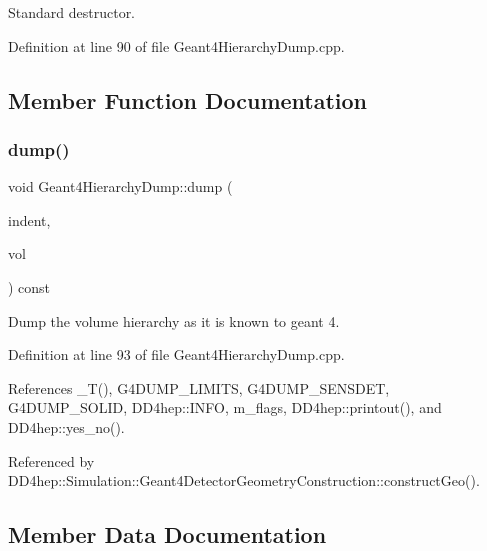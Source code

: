 Standard destructor. 



Definition at line 90 of file Geant4\+Hierarchy\+Dump.\+cpp.



\subsection{Member Function Documentation}
\hypertarget{class_d_d4hep_1_1_simulation_1_1_geant4_hierarchy_dump_a47fcb3062abf62695a7cff1bb61fa1e1}{}\label{class_d_d4hep_1_1_simulation_1_1_geant4_hierarchy_dump_a47fcb3062abf62695a7cff1bb61fa1e1} 
\subsubsection{\texorpdfstring{dump()}{dump()}}
{\footnotesize\ttfamily void Geant4\+Hierarchy\+Dump\+::dump (\begin{DoxyParamCaption}\item[{const std\+::string \&}]{indent,  }\item[{const G4\+V\+Physical\+Volume $\ast$}]{vol }\end{DoxyParamCaption}) const\hspace{0.3cm}{\ttfamily [virtual]}}



Dump the volume hierarchy as it is known to geant 4. 



Definition at line 93 of file Geant4\+Hierarchy\+Dump.\+cpp.



References \+\_\+\+T(), G4\+D\+U\+M\+P\+\_\+\+L\+I\+M\+I\+TS, G4\+D\+U\+M\+P\+\_\+\+S\+E\+N\+S\+D\+ET, G4\+D\+U\+M\+P\+\_\+\+S\+O\+L\+ID, D\+D4hep\+::\+I\+N\+FO, m\+\_\+flags, D\+D4hep\+::printout(), and D\+D4hep\+::yes\+\_\+no().



Referenced by D\+D4hep\+::\+Simulation\+::\+Geant4\+Detector\+Geometry\+Construction\+::construct\+Geo().



\subsection{Member Data Documentation}
\hypertarget{class_d_d4hep_1_1_simulation_1_1_geant4_hierarchy_dump_a28785ab85c2dfa536abf8050804796d7}{}\label{class_d_d4hep_1_1_simulation_1_1_geant4_hierarchy_dump_a28785ab85c2dfa536abf8050804796d7} 
